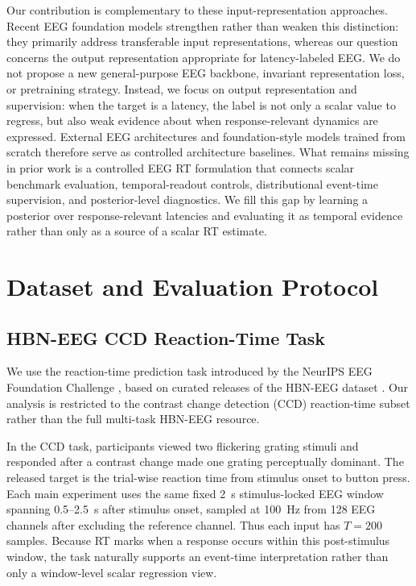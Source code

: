 \documentclass[12pt]{article}
\begin{document}
Our contribution is complementary to these input-representation approaches. Recent EEG foundation models strengthen rather than weaken this distinction: they primarily address transferable input representations, whereas our question concerns the output representation appropriate for latency-labeled EEG. We do not propose a new general-purpose EEG backbone, invariant representation loss, or pretraining strategy. Instead, we focus on output representation and supervision: when the target is a latency, the label is not only a scalar value to regress, but also weak evidence about when response-relevant dynamics are expressed. External EEG architectures and foundation-style models trained from scratch therefore serve as controlled architecture baselines. What remains missing in prior work is a controlled EEG RT formulation that connects scalar benchmark evaluation, temporal-readout controls, distributional event-time supervision, and posterior-level diagnostics. We fill this gap by learning a posterior over response-relevant latencies and evaluating it as temporal evidence rather than only as a source of a scalar RT estimate.


\section{Dataset and Evaluation Protocol}
\label{sec:dataset_protocol}

\subsection{HBN-EEG CCD Reaction-Time Task}

We use the reaction-time prediction task introduced by the NeurIPS EEG Foundation Challenge \citep{EEGChallengeWebsite2025,EEGFoundationChallengeArxiv2025}, based on curated releases of the HBN-EEG dataset \citep{Shirazi2024HBNEEG}. Our analysis is restricted to the contrast change detection (CCD) reaction-time subset rather than the full multi-task HBN-EEG resource.

In the CCD task, participants viewed two flickering grating stimuli and responded after a contrast change made one grating perceptually dominant. The released target is the trial-wise reaction time from stimulus onset to button press. Each main experiment uses the same fixed 2~s stimulus-locked EEG window spanning 0.5--2.5~s after stimulus onset, sampled at 100~Hz from 128 EEG channels after excluding the reference channel. Thus each input has \(T=200\) samples. Because RT marks when a response occurs within this post-stimulus window, the task naturally supports an event-time interpretation rather than only a window-level scalar regression view.
\end{document}
